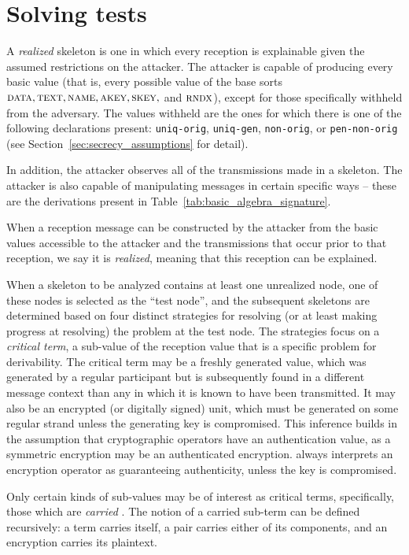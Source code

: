 \section{Solving tests}
\label{sec:tests}

 A \emph{realized} skeleton is one in which
every reception is explainable given the assumed restrictions on the
attacker.  The attacker is capable of producing every basic value
(that is, every possible value of the base sorts
$\scap{data},\scap{text},\scap{name},\scap{akey},\scap{skey},$ and
$\scap{rndx}$), except for those specifically withheld from the
adversary.  The values withheld are the ones for which there is one of
the following declarations present: \texttt{uniq-orig},
\texttt{uniq-gen}, \texttt{non-orig}, or \texttt{pen-non-orig} (see
Section~\ref{sec:secrecy_assumptions} for detail).

In addition, the attacker observes all of the transmissions made in a
skeleton.  The attacker is also capable of manipulating messages in
certain specific ways -- these are the derivations present in
Table~\ref{tab:basic_algebra_signature}.

When a reception message can be constructed by the attacker from the
basic values accessible to the attacker and the transmissions that
occur prior to that reception, we say it is \emph{realized}, meaning
that this reception can be explained.

When a skeleton to be analyzed contains at least one unrealized node,
one of these nodes is selected as the ``test node'', and the
subsequent skeletons are determined based on four distinct strategies
for resolving (or at least making progress at resolving) the problem
at the test node.  The strategies focus on a \emph{critical term}, a
sub-value of the reception value that is a specific problem for
derivability.  The critical term may be a freshly generated value,
which was generated by a regular participant but is subsequently found
in a different message context than any in which it is known to have
been transmitted.  It may also be an encrypted (or digitally signed)
unit, which must be generated on some regular strand unless the
generating key is compromised.  This inference builds in the
assumption that cryptographic operators have an authentication value,
as a symmetric encryption may be an authenticated encryption.  {\cpsa}
always interprets an encryption operator as guaranteeing authenticity,
unless the key is compromised.

Only certain kinds of sub-values may be of interest as critical terms,
specifically, those which are \emph{carried} .
The notion of a carried sub-term can be defined recursively: a term
carries itself, a pair carries either of its components, and an
encryption carries its plaintext.

